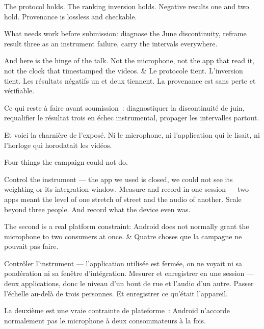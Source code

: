 \documentclass[10pt,a4paper]{article}
\begin{document}
\begin{say}
The protocol holds. The ranking inversion holds. Negative results one and two
hold. Provenance is lossless and checkable.

What needs work before submission: diagnose the June discontinuity, reframe
result three as an instrument failure, carry the intervals everywhere.

And here is the hinge of the talk.  Not the microphone,
not the app that read it, not the clock that timestamped the videos.
&
Le protocole tient. L'inversion tient. Les résultats négatifs un et deux tiennent.
La provenance est sans perte et vérifiable.

Ce qui reste à faire avant soumission~: diagnostiquer la discontinuité de juin,
requalifier le résultat trois en échec instrumental, propager les intervalles
partout.

Et voici la charnière de l'exposé.  Ni le
microphone, ni l'application qui le lisait, ni l'horloge qui horodatait les
vidéos.
\end{say}

\clearpage

\begin{say}
Four things the campaign could not do.

Control the instrument --- the app we used is closed, we could not see its
weighting or its integration window. Measure and record in one session --- two
apps meant the level of one stretch of street and the audio of another. Scale
beyond three people. And record what the device even was.

The second is a real platform constraint: Android does not normally grant the
microphone to two consumers at once.
&
Quatre choses que la campagne ne pouvait pas faire.

Contrôler l'instrument --- l'application utilisée est fermée, on ne voyait ni sa
pondération ni sa fenêtre d'intégration. Mesurer et enregistrer en une session ---
deux applications, donc le niveau d'un bout de rue et l'audio d'un autre. Passer
l'échelle au-delà de trois personnes. Et enregistrer ce qu'était l'appareil.

La deuxième est une vraie contrainte de plateforme~: Android n'accorde
normalement pas le microphone à deux consommateurs à la fois.
\end{say}
\end{document}

